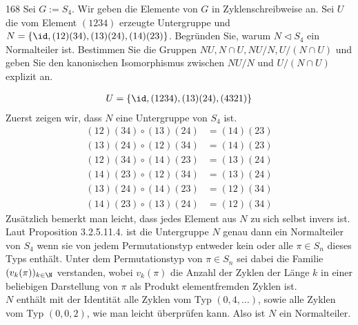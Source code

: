 \begin{algebraUE}{168}
Sei $G := S_4$. Wir geben die Elemente von $G$ in Zyklenschreibweise an. Sei
$U$ die vom Element $(1234)$ erzeugte Untergruppe und $N = \{\id, (12)(34),(13)(24),(14)(23)\}$.
Begründen Sie, warum $N \vartriangleleft S_4$ ein Normalteiler ist. Bestimmen
Sie die Gruppen $NU, N\cap U, NU/N, U/(N \cap U)$ und geben Sie den kanonischen
Isomorphismus zwischen $NU/N$ und $U/(N \cap U)$ explizit an.
\end{algebraUE}
\begin{solution}
\begin{align*}
  U = \{\id, (1234),(13)(24),(4321)\}
\end{align*}
Zuerst zeigen wir, dass $N$ eine Untergruppe von $S_4$ ist.
\begin{align*}
  (12)(34) \circ (13)(24) &= (14)(23) \\
  (13)(24) \circ (12)(34) &= (14)(23) \\
  (12)(34) \circ (14)(23) &= (13)(24) \\
  (14)(23) \circ (12)(34) &= (13)(24) \\
  (13)(24) \circ (14)(23) &= (12)(34) \\
  (14)(23) \circ (13)(24) &= (12)(34)
\end{align*}
Zusätzlich bemerkt man leicht, dass jedes Element aus $N$ zu sich selbst invers ist.
Laut Proposition 3.2.5.11.4. ist die Untergruppe $N$ genau dann ein Normalteiler von $S_4$
wenn sie von jedem Permutationstyp entweder kein oder alle $\pi \in S_n$ dieses Typs
enthält. Unter dem Permutationstyp von $\pi \in S_n$ sei dabei die Familie $(v_k(\pi))_{k \in \N}$
verstanden, wobei $v_k(\pi)$ die Anzahl der Zyklen der Länge $k$ in einer beliebigen
Darstellung von $\pi$ als Produkt elementfremden Zyklen ist. \\
$N$ enthält mit der Identität alle Zyklen vom Typ $(0,4,\dots)$, sowie alle
Zyklen vom Typ $(0,0,2)$, wie man leicht überprüfen kann.
Also ist $N$ ein Normalteiler.


\end{solution}
